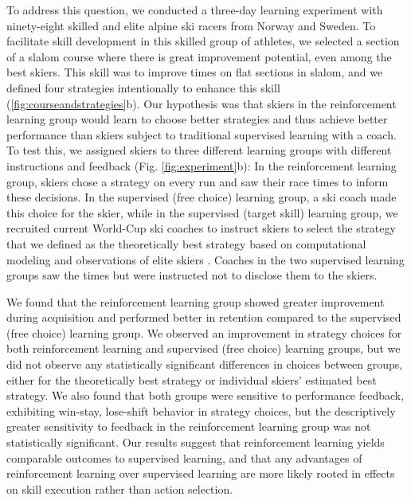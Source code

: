\documentclass{article}
\begin{document}
To address this question, we conducted a three-day learning experiment with ninety-eight skilled and elite alpine ski racers from Norway and Sweden. To facilitate skill development in this skilled group of athletes, we selected a section of a slalom course where there is great improvement potential, even among the best skiers. This skill was to improve times on flat sections in slalom, and we defined four strategies intentionally to enhance this skill (\ref{fig:courseandstrategies}b). Our hypothesis was that skiers in the reinforcement learning group would learn to choose better strategies and thus achieve better performance than skiers subject to traditional supervised learning with a coach. To test this, we assigned skiers to three different learning groups with different instructions and feedback (Fig. \ref{fig:experiment}b): In the reinforcement learning group, skiers chose a strategy on every run and saw their race times to inform these decisions. In the supervised (free choice) learning group, a ski coach made this choice for the skier, while in the supervised (target skill) learning group, we recruited current World-Cup ski coaches to instruct skiers to select the strategy that we defined as the theoretically best strategy based on computational modeling \cite{lind_physics_2013} and observations of elite skiers \cite{reid_alpine_2020}. Coaches in the two supervised learning groups saw the times but were instructed not to disclose them to the skiers. 

We found that the reinforcement learning group showed greater improvement during acquisition and performed better in retention compared to the supervised (free choice) learning group. We observed an improvement in strategy choices for both reinforcement learning and supervised (free choice) learning groups, but we did not observe any statistically significant differences in choices between groups, either for the theoretically best strategy or individual skiers' estimated best strategy. We also found that both groups were sensitive to performance feedback, exhibiting win-stay, lose-shift behavior in strategy choices, but the descriptively greater sensitivity to feedback in the \textbf{}reinforcement learning group was not statistically significant. Our results suggest that reinforcement learning yields comparable outcomes to supervised learning, and that any advantages of reinforcement learning over supervised learning are more likely rooted in effects on skill execution rather than action selection. 
\end{document}
